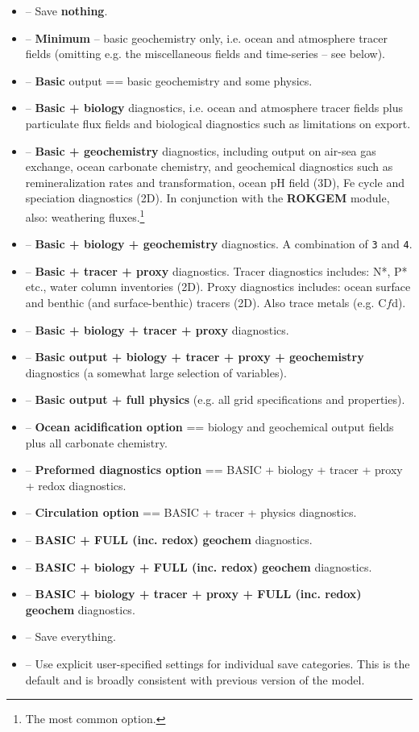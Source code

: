 \documentclass[11pt,fleqn]{book} %
\begin{document}
\vspace{2mm}\begin{itemize}

\item[0] -- Save \textbf{nothing}.
\item[1] -- \textbf{Minimum} -- basic geochemistry only, i.e. ocean and atmosphere tracer fields (omitting e.g. the miscellaneous fields and time-series -- see below).
\item[2] -- \textbf{Basic} output == basic geochemistry and some physics.
\item[3] -- \textbf{Basic + biology} diagnostics, i.e. ocean and atmosphere tracer fields plus particulate  flux fields and biological diagnostics such as limitations on export.
\item[4] -- \textbf{Basic + geochemistry} diagnostics, including output on air-sea gas exchange, ocean carbonate chemistry, and geochemical diagnostics such as remineralization rates and transformation, ocean pH field (3D), Fe cycle and speciation diagnostics (2D). In conjunction with the \textbf{ROKGEM} module, also: weathering fluxes.\footnote{The most common option.} \item[5] -- \textbf{Basic + biology + geochemistry} diagnostics. A combination of \texttt{3} and \texttt{4}.
\item[6] -- \textbf{Basic + tracer + proxy} diagnostics. Tracer diagnostics includes: N*, P* etc., water column inventories (2D). Proxy diagnostics includes: ocean surface and benthic (and surface-benthic) tracers (2D). Also trace metals (e.g. C\(f\)d).\item[7] -- \textbf{Basic + biology + tracer + proxy} diagnostics. 
\item[8] -- \textbf{Basic output + biology + tracer + proxy + geochemistry} diagnostics (a somewhat large selection of variables).
\item[9] -- \textbf{Basic output + full physics} (e.g. all grid specifications and properties).
\item[10] -- \textbf{Ocean acidification option} == biology and geochemical output fields plus all carbonate chemistry.
\item[11] -- \textbf{Preformed diagnostics option} == BASIC + biology + tracer + proxy + redox diagnostics.
\item[12] -- \textbf{Circulation option} == BASIC + tracer + physics diagnostics.
\item[14] -- \textbf{ BASIC + FULL (inc. redox) geochem} diagnostics.
\item[15] -- \textbf{ BASIC + biology + FULL (inc. redox) geochem} diagnostics.
\item[16] -- \textbf{ BASIC + biology + tracer + proxy + FULL (inc. redox) geochem} diagnostics.
\item[99] -- Save everything.
\item[>99] -- Use explicit user-specified settings for individual save categories. This is the default and is broadly consistent with previous version of the model.

\end{itemize}\vspace{2mm}
\end{document}
